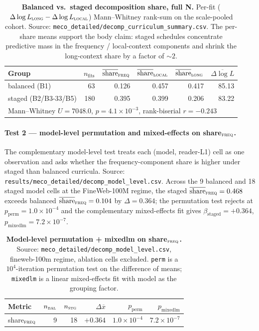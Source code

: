 \begin{table}[!ht]
  \centering
  \small
  \caption{\textbf{Balanced vs.\ staged decomposition share, full N.} Per-fit ($\Delta\log L_\textsc{long} - \Delta\log L_\textsc{local}$) Mann--Whitney rank-sum on the scale-pooled cohort. Source: \texttt{meco\_detailed/decomp\_curriculum\_summary.csv}. The per-share means support the body claim: staged schedules concentrate predictive mass in the frequency / local-context components and shrink the long-context share by a factor of $\sim 2$.}
  \label{tab:sig_decomp_curriculum}
  \begin{tabular}{lrrrrr}
    \toprule
    Group & $n_\text{fits}$ & $\overline{\text{share}}_\textsc{freq}$ & $\overline{\text{share}}_\textsc{local}$ & $\overline{\text{share}}_\textsc{long}$ & $\overline{\Delta\log L}$ \\
    \midrule
    balanced (B1)            & 63  & 0.126 & 0.457 & 0.417 & 85.13 \\
    staged (B2/B3-33/B5)     & 180 & 0.395 & 0.399 & 0.206 & 83.22 \\
    \midrule
    \multicolumn{6}{l}{Mann--Whitney $U = 7048.0$, $p = 4.1{\times}10^{-3}$, rank-biserial $r = -0.243$}\\
    \bottomrule
  \end{tabular}
\end{table}

\paragraph{Test 2 --- model-level permutation and mixed-effects on share$_\textsc{freq}$.} The complementary model-level test treats each (model, reader-L1) cell as one observation and asks whether the frequency-component share is higher under staged than balanced curricula. Source: \texttt{results/meco\_detailed/decomp\_model\_level.csv}. Across the 9 balanced and 18 staged model cells at the FineWeb-100M regime, the staged $\overline{\text{share}}_\textsc{freq} = 0.468$ exceeds balanced $\overline{\text{share}}_\textsc{freq} = 0.104$ by $\Delta = 0.364$; the permutation test rejects at $p_\text{perm} = 1.0{\times}10^{-4}$ and the complementary mixed-effects fit gives $\beta_\text{staged} = +0.364$, $p_\text{mixedlm} = 7.2{\times}10^{-7}$.

\begin{table}[!ht]
  \centering
  \small
  \caption{\textbf{Model-level permutation + mixedlm on share$_\textsc{freq}$.} Source: \texttt{meco\_detailed/decomp\_model\_level.csv}, fineweb-100m regime, ablation cells excluded. \texttt{perm} is a $10^{4}$-iteration permutation test on the difference of means; \texttt{mixedlm} is a linear mixed-effects fit with model as the grouping factor.}
  \label{tab:sig_decomp_model_level}
  \begin{tabular}{lrrrrr}
    \toprule
    Metric & $n_\textsc{bal}$ & $n_\textsc{stg}$ & $\Delta\overline{x}$ & $p_\text{perm}$ & $p_\text{mixedlm}$ \\
    \midrule
    share$_\textsc{freq}$ & 9 & 18 & $+0.364$ & $1.0{\times}10^{-4}$ & $7.2{\times}10^{-7}$ \\
    \bottomrule
  \end{tabular}
\end{table}

